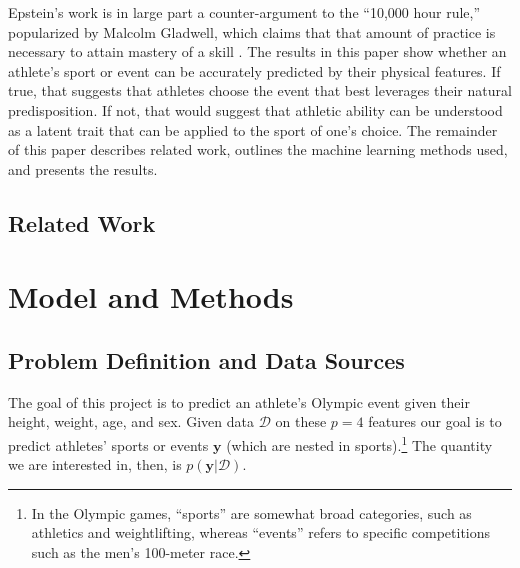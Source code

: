 \documentclass[12pt,letterpaper]{article} %
\begin{document}
Epstein's work is in large part a counter-argument to the ``10,000 hour rule,'' popularized by Malcolm Gladwell, which claims that that amount of practice is necessary to attain mastery of a skill \citep{gladwell2008outliers}. The results in this paper show whether an athlete's sport or event can be accurately predicted by their physical features. If true, that suggests that athletes choose the event that best leverages their natural predisposition. If not, that would suggest that athletic ability can be understood as a latent trait that can be applied to the sport of one's choice. The remainder of this paper describes related work, outlines the machine learning methods used, and presents the results.


\subsection{Related Work}





\section{Model and Methods}

\subsection{Problem Definition and Data Sources}

The goal of this project is to predict an athlete's Olympic event given their height, weight, age, and sex. Given data $\mathcal{D}$ on these $p=4$ features our goal is to predict athletes' sports or events $\mathbf{y}$ (which are nested in sports).\footnote{In the Olympic games, ``sports'' are somewhat broad categories, such as athletics and weightlifting, whereas ``events'' refers to specific competitions such as the men's 100-meter race.} The quantity we are interested in, then, is $p(\mathbf{y}|\mathcal{D})$.
\end{document}

